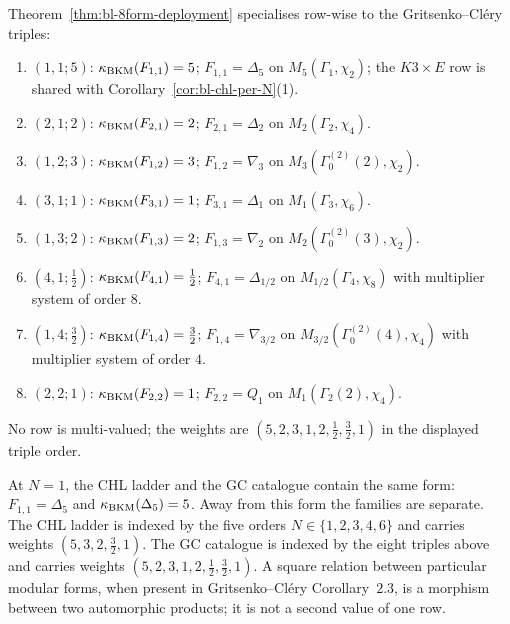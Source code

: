 \begin{corollary}
\label{cor:bl-8form-per-N}
Theorem~\ref{thm:bl-8form-deployment} specialises row-wise to the
Gritsenko--Cl\'ery triples:
\begin{enumerate}
 \item $(1,1;5)$: $\kappa_{\mathrm{BKM}}(F_{1,1}) = 5$; $F_{1,1}=\Delta_5$ on
 $M_5(\Gamma_1,\chi_2)$; the $K3 \times E$ row is shared with
 Corollary~\ref{cor:bl-chl-per-N}(1).
 \item $(2,1;2)$: $\kappa_{\mathrm{BKM}}(F_{2,1}) = 2$; $F_{2,1}=\Delta_2$ on
 $M_2(\Gamma_2,\chi_4)$.
 \item $(1,2;3)$: $\kappa_{\mathrm{BKM}}(F_{1,2}) = 3$; $F_{1,2}=\nabla_3$ on
 $M_3(\Gamma_0^{(2)}(2),\chi_2)$.
 \item $(3,1;1)$: $\kappa_{\mathrm{BKM}}(F_{3,1}) = 1$; $F_{3,1}=\Delta_1$ on
 $M_1(\Gamma_3,\chi_6)$.
 \item $(1,3;2)$: $\kappa_{\mathrm{BKM}}(F_{1,3}) = 2$; $F_{1,3}=\nabla_2$ on
 $M_2(\Gamma_0^{(2)}(3),\chi_2)$.
 \item $(4,1;\tfrac{1}{2})$: $\kappa_{\mathrm{BKM}}(F_{4,1}) = \tfrac{1}{2}$;
 $F_{4,1}=\Delta_{1/2}$ on $M_{1/2}(\Gamma_4,\chi_8)$ with
 multiplier system of order $8$.
 \item $(1,4;\tfrac{3}{2})$: $\kappa_{\mathrm{BKM}}(F_{1,4}) = \tfrac{3}{2}$;
 $F_{1,4}=\nabla_{3/2}$ on
 $M_{3/2}(\Gamma_0^{(2)}(4),\chi_4)$ with multiplier system of order
 $4$.
 \item $(2,2;1)$: $\kappa_{\mathrm{BKM}}(F_{2,2}) = 1$; $F_{2,2}=Q_1$ on
 $M_1(\Gamma_2(2),\chi_4)$.
\end{enumerate}
No row is multi-valued; the weights are
$(5, 2, 3, 1, 2, \tfrac{1}{2}, \tfrac{3}{2}, 1)$ in the displayed
triple order.
\end{corollary}

\begin{remark}
\label{rem:bl-two-scope-coincidence-divergence}
At $N = 1$, the CHL ladder and the GC catalogue contain the same form:
$F_{1,1}=\Delta_5$ and $\kappa_{\mathrm{BKM}}(\Delta_5)=5$. Away from this form the families are
separate. The CHL ladder is indexed by the five orders
$N \in \{1,2,3,4,6\}$ and carries weights $(5,3,2,\tfrac32,1)$. The GC
catalogue is indexed by the eight triples above and carries weights
$(5,2,3,1,2,\tfrac{1}{2},\tfrac{3}{2},1)$. A square relation between
particular modular forms, when present in Gritsenko--Cl\'ery
Corollary~$2.3$, is a morphism between two automorphic products; it is
not a second value of one row.
\end{remark}

